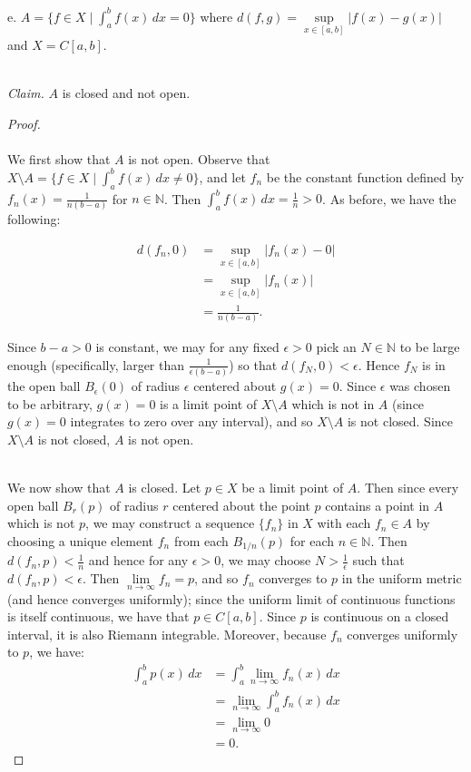 \pagebreak

e.  $A = \{ f \in X \mid \int_a^b{f(x) \,dx} = 0 \}$ where $d(f, g) = \sup\limits_{x \in [a, b]}{|f(x) - g(x)|}$ and 
    $X = C[a, b]$.

\ \\
\emph{Claim.} $A$ is closed and not open.

\begin{proof}\ \\\\
    We first show that $A$ is not open. Observe that $X \setminus A = \{f \in X \mid \int_a^b{f(x) \,dx} \neq 0 \}$, and
    let $f_n$ be the constant function defined by $f_n(x) = \frac{1}{n(b - a)}$ for $n \in \mathbb{N}$. Then 
    $\int_a^b{f(x) \,dx} = \frac{1}{n} > 0$. As before, we have the following:


    \begin{align*}
         d(f_n, 0) &= \sup\limits_{x \in [a, b]}{|f_n(x) - 0|} \\ 
                   &= \sup\limits_{x \in [a, b]}{|f_n(x)|} \\ 
                   &= \frac{1}{n(b - a)}.
    \end{align*}

    Since $b - a > 0$ is constant, we may for any fixed $\epsilon > 0$ pick an $N \in \mathbb{N}$ to be large enough 
    (specifically, larger than $\frac{1}{\epsilon(b - a)}$) so that $d(f_N, 0) < \epsilon$. Hence $f_N$ is in
    the open ball $B_\epsilon(0)$ of radius $\epsilon$ centered about $g(x) = 0$. Since $\epsilon$ was chosen to be
    arbitrary, $g(x) = 0$ is a limit point of $X \setminus A$ which is not in $A$ (since $g(x) = 0$ integrates to zero 
    over any interval), and so $X \setminus A$ is not closed. Since $X \setminus A$ is not closed, $A$ is not open.

    \ \\
    We now show that $A$ is closed. Let $p \in X$ be a limit point of $A$. Then since every open ball $B_r(p)$ of radius
    $r$ centered about the point $p$ contains a point in $A$ which is not $p$, we may construct a sequence 
    $\{ f_n \}$ in $X$ with each $f_n \in A$ by choosing a unique element $f_n$ from each $B_{1/n}(p)$ for each
    $n \in \mathbb{N}$. Then $d(f_n, p) < \frac{1}{n}$ and hence for any $\epsilon > 0$, we may choose 
    $N > \frac{1}{\epsilon}$ such that $d(f_n, p) < \epsilon$. Then $\lim\limits_{n \to \infty}{f_n} = p$, and so
    $f_n$ converges to $p$ in the uniform metric (and hence converges uniformly); since the uniform limit of continuous 
    functions is itself continuous, we have that $p \in C[a, b]$. Since $p$ is continuous on a closed interval, it is 
    also Riemann integrable. Moreover, because $f_n$ converges uniformly to $p$, we have:
    \begin{align*}
       \int_a^b{p(x) \,dx} &= \int_a^b{\lim\limits_{n \to \infty}{f_n(x)} \,dx} \\
                           &= \lim\limits_{n \to \infty}{\int_a^b{f_n(x) \,dx}} \\
                           &= \lim\limits_{n \to \infty}{0} \\
                           &= 0.
    \end{align*}


\end{proof}
